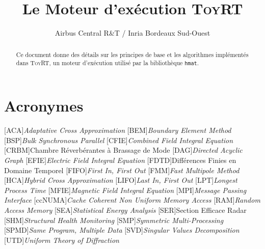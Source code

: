 \documentclass[11pt]{article}
\title{Le Moteur d'exécution \textsc{ToyRT}}
\author{Airbus Central R\&T / Inria Bordeaux Sud-Ouest}
\theoremstyle{plain} %
\theoremstyle{definition} %
\begin{document}
\maketitle

\newcommand{\mc}[1]{\mathcal{#1}}
\newcommand{\mcH}{$\mc{H}$}
\newcommand{\hmat}{$\mc{H}$-Matrice}
\newcommand{\hmats}{$\mc{H}$-Matrices}
\newcommand{\hvec}{$\mc{H}$-Vecteur}
\newcommand{\hvecs}{$\mc{H}$-Vecteurs}
\newcommand{\rkmat}{$\mc{R}k$-Matrice}
\newcommand{\rkmats}{$\mc{R}k$-Matrices}



\begin{abstract}
  Ce document donne des détails sur les principes de base et les algorithmes implémentés dans \textsc{ToyRT}, un moteur d'exécution utilisé par la bibliothèque \texttt{hmat}.
\end{abstract}

\tableofcontents

\section*{Acronymes}
\label{sec:acronymes}
\begin{acronym}[ccNUMA]
  [ACA]{\emph{Adaptative Cross Approximation}}
  [BEM]{\emph{Boundary Element Method}}
  [BSP]{\emph{Bulk Synchronous Parallel}}
  [CFIE]{\emph{Combined Field Integral Equation}}
  [CRBM]{Chambre Réverbérantes à Brassage de Mode}
  [DAG]{\emph{Directed Acyclic Graph}}
  [EFIE]{\emph{Electric Field Integral Equation}}
  [FDTD]{Différences Finies en Domaine Temporel}
  [FIFO]{\emph{First In, First Out}}
  [FMM]{\emph{Fast Multipole Method}}
  [HCA]{\emph{Hybrid Cross Approximation}}
  [LIFO]{\emph{Last In, First Out}}
  [LPT]{\emph{Longest Process Time}}
  [MFIE]{\emph{Magnetic Field Integral Equation}}
  [MPI]{\emph{Message Passing Interface}}
  [ccNUMA]{\emph{Cache Coherent Non Uniform Memory Access}}
  [RAM]{\emph{Random Access Memory}}
  [SEA]{\emph{Statistical Energy Analysis}}
  [SER]{Section Efficace Radar}
  [SHM]{\emph{Structural Health Monitoring}}
  [SMP]{\emph{Symmetric Multi-Processing}}
  [SPMD]{\emph{Same Program, Multiple Data}}
  [SVD]{\emph{Singular Values Decomposition}}
  [UTD]{\emph{Uniform Theory of Diffraction}}
\end{acronym}
\end{document}
